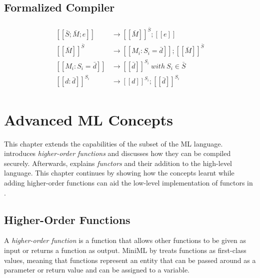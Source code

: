 \documentclass[10pt,a4paper,master=cws, masteroption=ai,english,inputenc=utf8]{kulemt}
\begin{document}


\section{Formalized Compiler}
\newcommand{\compile}[1]{\left[\left[#1\right]\right]}
\newcommand{\makes}{& \rightarrow}
\begin{align*}
\begin{aligned}
\compile{\bar{S};\bar{M};e} \makes \compile{\bar{M}}^{\bar{S}};\compile{e}\\ 
\compile{\bar{M}}^{\bar{S}}\makes \compile{M_{i}:S_{i} = \bar{d}};\compile{\bar{M}}^{\bar{S}}\\
\compile{M_{i}:S_{i} = \bar{d}} \makes \compile{\bar{d}}^{S_{i}} \mathit{\ with\ } S_{i} \in \bar{S} \\
\compile{d:\bar{d}}^{S_{i}} \makes \compile{d}^{S_{i}};\compile{\bar{d}}^{S_{i}}
\end{aligned}
\end{align*}

\chapter{Advanced ML Concepts}

This chapter extends the capabilities of the subset of the ML language.  introduces \emph{higher-order functions} and discusses how they can be compiled securely. Afterwards,  explains \emph{functors} and their addition to the high-level language. This chapter continues by showing how the concepts learnt while adding higher-order functions can aid the low-level implementation of functors in .

\section{Higher-Order Functions\label{sec:HOF}}

A \emph{higher-order function} is a function that allows other functions to be given as input or returns a function as output. \mbox{MiniML} by treats functions as first-class values, meaning that functions represent an entity that can be passed around as a parameter or return value and can be assigned to a variable.
\end{document}
